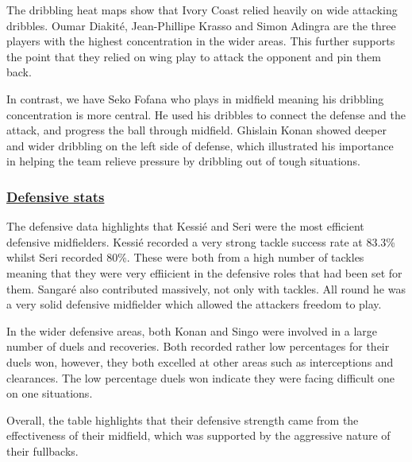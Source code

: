 \documentclass[
  11pt,
  letterpaper,
  DIV=11,
  numbers=noendperiod]{scrartcl}
\begin{document}
The dribbling heat maps show that Ivory Coast relied heavily on wide
attacking dribbles. Oumar Diakité, Jean-Phillipe Krasso and Simon
Adingra are the three players with the highest concentration in the
wider areas. This further supports the point that they relied on wing
play to attack the opponent and pin them back.

In contrast, we have Seko Fofana who plays in midfield meaning his
dribbling concentration is more central. He used his dribbles to connect
the defense and the attack, and progress the ball through midfield.
Ghislain Konan showed deeper and wider dribbling on the left side of
defense, which illustrated his importance in helping the team relieve
pressure by dribbling out of tough situations.

\subsubsection{\texorpdfstring{\ul{Defensive
stats}}{Defensive stats}}\label{defensive-stats}

The defensive data highlights that Kessié and Seri were the most
efficient defensive midfielders. Kessié recorded a very strong tackle
success rate at 83.3\% whilst Seri recorded 80\%. These were both from a
high number of tackles meaning that they were very effiicient in the
defensive roles that had been set for them. Sangaré also contributed
massively, not only with tackles. All round he was a very solid
defensive midfielder which allowed the attackers freedom to play.

In the wider defensive areas, both Konan and Singo were involved in a
large number of duels and recoveries. Both recorded rather low
percentages for their duels won, however, they both excelled at other
areas such as interceptions and clearances. The low percentage duels won
indicate they were facing difficult one on one situations.

Overall, the table highlights that their defensive strength came from
the effectiveness of their midfield, which was supported by the
aggressive nature of their fullbacks.
\end{document}
